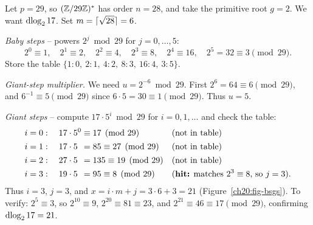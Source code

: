 \begin{example}[BSGS by hand, $p=29$]
\label{ch20:ex-bsgs}
Let $p = 29$, so $(\mathbb{Z}/29\mathbb{Z})^{*}$ has order $n = 28$, and take the primitive root $g = 2$. We want $\operatorname{dlog}_2 17$. Set
$m = \lceil\sqrt{28}\rceil = 6$.

\emph{Baby steps} -- powers $2^j \bmod 29$ for $j = 0, \dots, 5$:
\[
  2^0 \equiv 1,\quad 2^1 \equiv 2,\quad 2^2 \equiv 4,\quad 2^3 \equiv 8,\quad 2^4 \equiv 16,\quad 2^5 = 32 \equiv 3 \pmod{29}.
\]
Store the table $\{1{:}0,\ 2{:}1,\ 4{:}2,\ 8{:}3,\ 16{:}4,\ 3{:}5\}$.

\emph{Giant-step multiplier.} We need $u = 2^{-6} \bmod 29$. First $2^{6} = 64 \equiv 6 \pmod{29}$, and
$6^{-1} \equiv 5 \pmod{29}$ since $6 \cdot 5 = 30 \equiv 1 \pmod{29}$. Thus $u = 5$.

\emph{Giant steps} -- compute $17 \cdot 5^{i} \bmod 29$ for $i = 0, 1, \dots$ and check the table:
\begin{align*}
  i = 0:\quad 17 \cdot 5^0 &\equiv 17 \pmod{29} && \text{(not in table)} \\
  i = 1:\quad 17 \cdot 5\phantom{^0} &= 85 \equiv 27 \pmod{29} && \text{(not in table)} \\
  i = 2:\quad 27 \cdot 5\phantom{^0} &= 135 \equiv 19 \pmod{29} && \text{(not in table)} \\
  i = 3:\quad 19 \cdot 5\phantom{^0} &= 95 \equiv 8 \pmod{29} && \text{(\textbf{hit:} matches $2^3 \equiv 8$, so $j = 3$).}
\end{align*}
Thus $i = 3$, $j = 3$, and $x = i \cdot m + j = 3\cdot 6 + 3 = 21$ (Figure~\ref{ch20:fig-bsgs}). To verify: $2^5 \equiv 3$, so $2^{10} \equiv 9$, $2^{20} \equiv 81 \equiv 23$, and $2^{21} \equiv 46 \equiv 17 \pmod{29}$, confirming $\operatorname{dlog}_2 17 = 21$.
\end{example}

